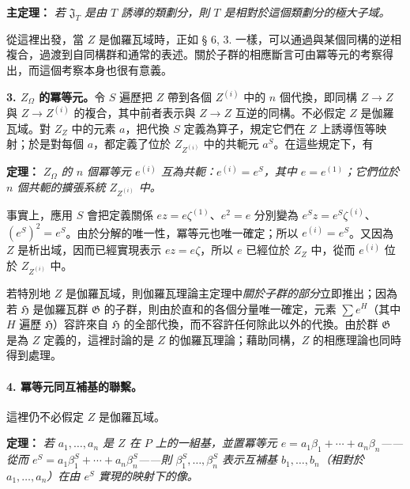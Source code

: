 \documentclass[11pt]{article}
\providecommand{\srcspaced}[1]{#1}
\providecommand{\Gcal}{\mathfrak G}
\begin{document}
\noindent\textbf{\srcspaced{主定理：}} \emph{若 \(\mathfrak J_T\) 是由 \(T\) 誘導的類劃分，則 \(T\) 是相對於這個類劃分的極大子域。}

從這裡出發，當 \(Z\) 是伽羅瓦域時，正如 § 6, 3. 一樣，可以通過與某個同構的逆相複合，過渡到自同構群和通常的表述。關於子群的相應斷言可由冪等元的考察得出，而這個考察本身也很有意義。

\medskip
\noindent\textbf{\srcspaced{3. \(Z_\Omega\) 的冪等元。}}\quad 令 \(S\) 遍歷把 \(Z\) 帶到各個 \(Z^{(i)}\) 中的 \(n\) 個代換，即同構 \(Z\to Z\) 與 \(Z\to Z^{(i)}\) 的複合，其中前者表示與 \(Z\to Z\) 互逆的同構。不必假定 \(Z\) 是伽羅瓦域。對 \(Z_Z\) 中的元素 \(a\)，把代換 \(S\) 定義為算子，規定它們在 \(Z\) 上誘導恆等映射；於是對每個 \(a\)，都定義了位於 \(Z_{Z^{(i)}}\) 中的共軛元 \(a^S\)。在這些規定下，有

\noindent\textbf{\srcspaced{定理：}} \emph{\(Z_\Omega\) 的 \(n\) 個冪等元 \(e^{(i)}\) 互為共軛：\(e^{(i)}=e^S\)，其中 \(e=e^{(1)}\)；它們位於 \(n\) 個共軛的擴張系統 \(Z_{Z^{(i)}}\) 中。}

事實上，應用 \(S\) 會把定義關係 \(ez=e\zeta^{(1)}\)、\(e^2=e\) 分別變為 \(e^Sz=e^S\zeta^{(i)}\)、\((e^S)^2=e^S\)。由於分解的唯一性，冪等元也唯一確定；所以 \(e^{(i)}=e^S\)。又因為 \(Z\) 是析出域，因而已經實現表示 \(ez=e\zeta\)，所以 \(e\) 已經位於 \(Z_Z\) 中，從而 \(e^{(i)}\) 位於 \(Z_{Z^{(i)}}\) 中。

若特別地 \(Z\) 是伽羅瓦域，則伽羅瓦理論主定理中\emph{關於子群的部分}立即推出；因為若 \(\mathfrak H\) 是伽羅瓦群 \(\Gcal\) 的子群，則由於直和的各個分量唯一確定，元素 \(\sum e^H\)（其中 \(H\) 遍歷 \(\mathfrak H\)）容許來自 \(\mathfrak H\) 的全部代換，而不容許任何除此以外的代換。由於群 \(\Gcal\) 是為 \(Z\) 定義的，這裡討論的是 \(Z\) 的伽羅瓦理論；藉助同構，\(Z\) 的相應理論也同時得到處理。

\paragraph{4. 冪等元同互補基的聯繫。}
這裡仍不必假定 \(Z\) 是伽羅瓦域。

\noindent\textbf{\srcspaced{定理：}} \emph{若 \(a_1,\ldots,a_n\) 是 \(Z\) 在 \(P\) 上的一組基，並置冪等元 \(e=a_1\beta_1+\cdots+a_n\beta_n\)——從而 \(e^S=a_1\beta_1^S+\cdots+a_n\beta_n^S\)——則 \(\beta_1^S,\ldots,\beta_n^S\) 表示互補基 \(b_1,\ldots,b_n\)（相對於 \(a_1,\ldots,a_n\)）在由 \(e^S\) 實現的映射下的像。}
\end{document}
